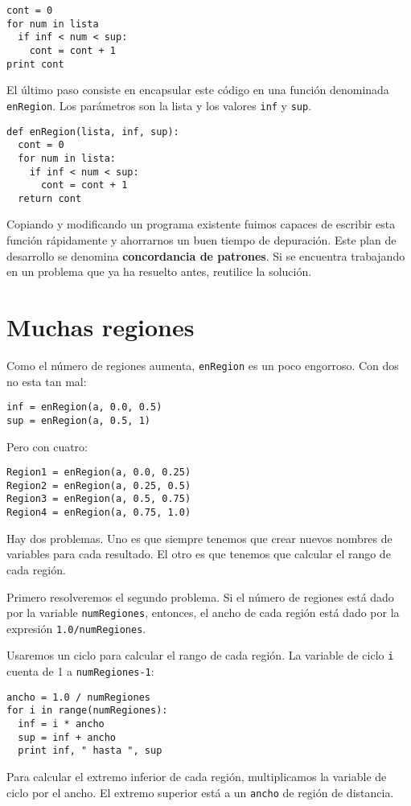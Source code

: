 \beforeverb
\begin{verbatim}
cont = 0
for num in lista
  if inf < num < sup:
    cont = cont + 1
print cont
\end{verbatim}
\afterverb
%
El último paso consiste en  encapsular este código en una
función denominada \texttt{enRegion}.  Los parámetros son la lista
y los valores \texttt{inf} y \texttt{sup}.

\beforeverb
\begin{verbatim}
def enRegion(lista, inf, sup):
  cont = 0
  for num in lista:
    if inf < num < sup:
      cont = cont + 1
  return cont
\end{verbatim}
\afterverb
%
Copiando y modificando un programa existente fuimos capaces
de escribir esta función rápidamente y ahorrarnos un buen
tiempo de depuración. Este plan de desarrollo se denomina
{\bf concordancia de patrones}. Si se encuentra trabajando 
en un problema que ya ha resuelto antes, reutilice la 
solución.

\section{Muchas regiones}

Como el número de regiones aumenta, \texttt{enRegion} es 
un poco engorroso. Con dos no esta tan mal:

\beforeverb
\begin{verbatim}
inf = enRegion(a, 0.0, 0.5)
sup = enRegion(a, 0.5, 1)
\end{verbatim}
\afterverb
%
Pero con cuatro:

\beforeverb
\begin{verbatim}
Region1 = enRegion(a, 0.0, 0.25)
Region2 = enRegion(a, 0.25, 0.5)
Region3 = enRegion(a, 0.5, 0.75)
Region4 = enRegion(a, 0.75, 1.0)
\end{verbatim}
\afterverb
%
Hay dos problemas. Uno es que siempre tenemos que crear
nuevos nombres de variables para cada resultado. El otro
es que tenemos que calcular el rango de cada región.

Primero resolveremos el segundo problema. Si el número de
regiones está dado por la variable \texttt{numRegiones}, entonces, 
el ancho de cada región está dado por la expresión \texttt{1.0/numRegiones}.

Usaremos un ciclo para calcular el rango de cada región.
La variable de ciclo \texttt{i} cuenta de 1 a \texttt{numRegiones-1}:

\beforeverb
\begin{verbatim}
ancho = 1.0 / numRegiones
for i in range(numRegiones):
  inf = i * ancho
  sup = inf + ancho
  print inf, " hasta ", sup
\end{verbatim}
\afterverb
%
Para calcular el extremo inferior de cada región, multiplicamos
la variable de ciclo por el ancho. El extremo superior está
 a un  \texttt{ancho} de región de distancia.

